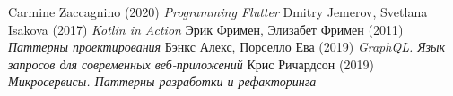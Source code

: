 \newpage
{} %
\renewcommand{\bibsection}{\centering\textbf{\large СПИСОК ИСПОЛЬЗОВАННЫХ ИСТОЧНИКОВ}} %


\begin{thebibliography}{9}
 Carmine Zaccagnino (2020) \emph{Programming Flutter}
 Dmitry Jemerov, Svetlana Isakova (2017) \emph{Kotlin in Action}
 Эрик Фримен, Элизабет Фримен (2011) \emph{Паттерны проектирования}
 Бэнкс Алекс, Порселло Ева (2019) \emph{GraphQL. Язык запросов для современных веб-приложений}
 Крис Ричардсон (2019) \emph{Микросервисы. Паттерны разработки и рефакторинга}

\end{thebibliography}